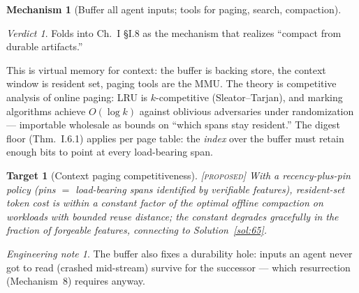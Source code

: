 \documentclass[11pt,a4paper]{article}
\newtheorem{target}{Target}[section]
\theoremstyle{definition}
\newtheorem{mech}{Mechanism}
\theoremstyle{remark}
\newtheorem*{verdict}{Verdict}
\newtheorem*{note}{Engineering note}
\newcommand{\grade}[1]{\textsc{[#1]}}
\begin{document}
\begin{mech}[Buffer all agent inputs; tools for paging, search, compaction]
\begin{verdict} Folds into Ch.~I \S I.8 as the mechanism that realizes ``compact from durable artifacts.'' \end{verdict}
This is virtual memory for context: the buffer is backing store, the context window is resident set, paging tools are the MMU. The theory is competitive analysis of online paging: LRU is $k$-competitive (Sleator--Tarjan), and marking algorithms achieve $O(\log k)$ against oblivious adversaries under randomization --- importable wholesale as bounds on ``which spans stay resident.'' The digest floor (Thm.~I.6.1) applies per page table: the \emph{index} over the buffer must retain enough bits to point at every load-bearing span.
\begin{target}[Context paging competitiveness]\grade{proposed} With a recency-plus-pin policy (pins $=$ load-bearing spans identified by verifiable features), resident-set token cost is within a constant factor of the optimal offline compaction on workloads with bounded reuse distance; the constant degrades gracefully in the fraction of forgeable features, connecting to Solution~\ref{sol:65}. \end{target}
\begin{note} The buffer also fixes a durability hole: inputs an agent never got to read (crashed mid-stream) survive for the successor --- which resurrection (Mechanism~8) requires anyway. \end{note}
\end{mech}
\end{document}
